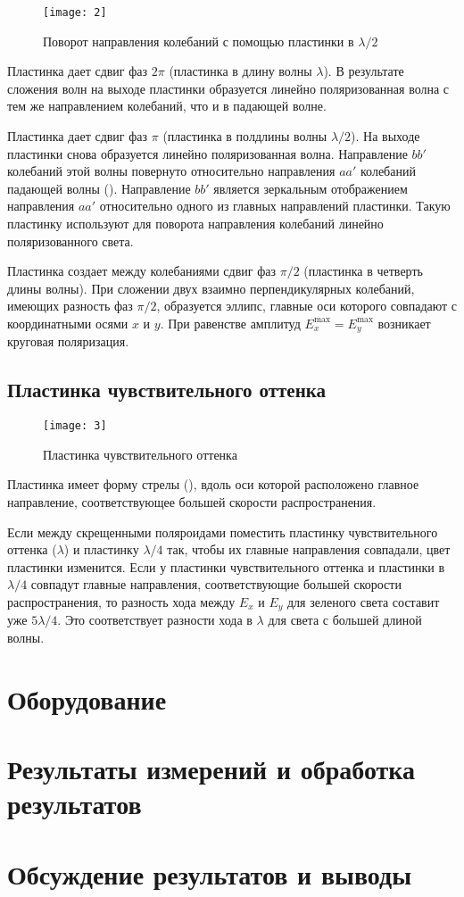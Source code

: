 \documentclass[a4paper, 12pt]{article}
\begin{document}
\begin{wrapfigure}[13]{l}{0.3\linewidth}
    \texttt{[image: 2]}
    \caption{Поворот направления колебаний с помощью пластинки в
    $\lambda/2$}
    \label{fig:2}
\end{wrapfigure}

Пластинка дает сдвиг фаз $2\pi$ (пластинка в длину волны $\lambda$). В
результате сложения волн на выходе пластинки образуется линейно
поляризованная волна с тем же направлением колебаний, что и в падающей
волне.

Пластинка дает сдвиг фаз $\pi$ (пластинка в полдлины волны
$\lambda/2$). На выходе пластинки снова образуется линейно
поляризованная волна. Направление $bb'$ колебаний этой волны повернуто
относительно направления $aa'$ колебаний падающей волны ().
Направление $bb'$ является зеркальным отображением направления $aa'$
относительно одного из главных направлений пластинки. Такую пластинку
используют для поворота направления колебаний линейно поляризованного
света.

Пластинка создает между колебаниями сдвиг фаз $\pi/2$ (пластинка в
четверть длины волны). При сложении двух взаимно перпендикулярных
колебаний, имеющих разность фаз $\pi/2$, образуется эллипс, главные
оси которого совпадают с координатными осями $x$ и $y$. При равенстве
амплитуд $E_x^\text{max} = E_y^\text{max}$ возникает круговая
поляризация.

\subsection*{Пластинка чувствительного оттенка}

\begin{wrapfigure}{l}{0.25\linewidth}
    \texttt{[image: 3]}
    \caption{Пластинка чувствительного оттенка}
    \label{fig:3}
\end{wrapfigure}

Пластинка имеет форму стрелы (), вдоль оси которой
расположено главное направление, соответствующее большей скорости
распространения.

Если между скрещенными поляроидами поместить пластинку чувствительного
оттенка ($\lambda$) и пластинку $\lambda/4$ так, чтобы их главные
направления совпадали, цвет пластинки изменится. Если у пластинки
чувствительного оттенка и пластинки в $\lambda/4$ совпадут главные
направления, соответствующие большей скорости распространения, то
разность хода между $E_x$ и $E_y$ для зеленого света составит уже
$5\lambda/4$. Это соответствует разности хода в $\lambda$ для света с
большей длиной волны.


\section{Оборудование}







\section{Результаты измерений и обработка результатов}







\section{Обсуждение результатов и выводы}
\end{document}
